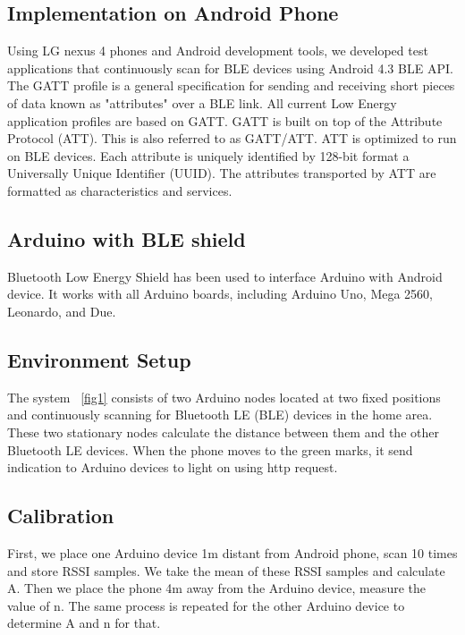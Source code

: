 \documentclass[conference,a4paper]{../../sty/IEEEtran}
\begin{document}
\subsection{Implementation on Android Phone}

Using LG nexus 4 phones and Android development tools, we developed test applications that continuously scan for BLE devices using Android 4.3 BLE API. The GATT profile is a general specification for sending and receiving short pieces of data known as "attributes" over a BLE link. All current Low Energy application profiles are based on GATT. GATT is built on top of the Attribute Protocol (ATT). This is also referred to as GATT/ATT. ATT is optimized to run on BLE devices. Each attribute is uniquely identified by 128-bit format a Universally Unique Identifier (UUID). The attributes transported by ATT are formatted as characteristics and services.

\subsection{Arduino with BLE shield}

Bluetooth Low Energy Shield has been used to interface Arduino with Android device. It works with all Arduino boards, including Arduino Uno, Mega 2560, Leonardo, and Due. 

\subsection{Environment Setup}

The system ~\ref{fig1} consists of two Arduino nodes located at two fixed positions and continuously scanning for Bluetooth LE (BLE) devices in the home area. These two stationary nodes calculate the distance between them and the other Bluetooth LE devices. When the phone moves to the green marks, it send indication to Arduino devices to light on using http request.





\subsection{Calibration}

First, we place one Arduino device 1m distant from Android phone, scan 10 times and store RSSI samples. We take the mean of these RSSI samples and calculate A. Then we place the phone 4m away from the Arduino device, measure the value of n. The same process is repeated for the other Arduino device to determine A and n for that.
\end{document}
